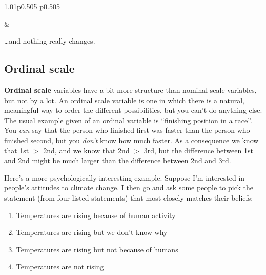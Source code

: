 \documentclass[
]{book}
\providecommand{\tightlist}{%
  \setlength{\itemsep}{0pt}\setlength{\parskip}{0pt}}
\begin{document}
\begin{table}[ht]
\begin{centerbox}
\begin{threeparttable}
\begin{tabularx}{1.01\textwidth}{p{} p{}}
\hhline{}

 &
 \tabularnewline[-0.5pt]


\end{tabularx}\captionsetup{justification=raggedright,singlelinecheck=off}
\caption{\label{tab:tab2-2} How did 100 people get to work today, a different view}
 
\end{threeparttable}\par\end{centerbox}

\end{table}
 

\ldots and nothing really changes.

\hypertarget{ordinal-scale}{%
\subsection{Ordinal scale}\label{ordinal-scale}}

\textbf{Ordinal scale} variables have a bit more structure than nominal scale variables, but not by a lot. An ordinal scale variable is one in which there is a natural, meaningful way to order the different possibilities, but you can't do anything else. The usual example given of an ordinal variable is ``finishing position in a race''. You \emph{can} say that the person who finished first was faster than the person who finished second, but you \emph{don't} know how much faster. As a consequence we know that 1st \(>\) 2nd, and we know that 2nd \(>\) 3rd, but the difference between 1st and 2nd might be much larger than the difference between 2nd and 3rd.

Here's a more psychologically interesting example. Suppose I'm interested in people's attitudes to climate change. I then go and ask some people to pick the statement (from four listed statements) that most closely matches their beliefs:

\begin{enumerate}
\def\labelenumi{\arabic{enumi}.}
\tightlist
\item
  Temperatures are rising because of human activity
\item
  Temperatures are rising but we don't know why
\item
  Temperatures are rising but not because of humans
\item
  Temperatures are not rising
\end{enumerate}
\end{document}
